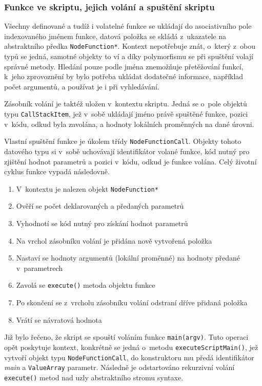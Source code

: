 \documentclass[11pt,twoside,a4paper]{book}
\begin{document}
\subsubsection{Funkce ve skriptu, jejich volání a spuštění skriptu}

Všechny definované a tudíž i volatelné funkce se ukládají do asociativního pole indexovaného jménem funkce, datová položka se skládá z~ukazatele na abstraktního předka \texttt{NodeFunction*}. Kontext nepotřebuje znát, o~který z~obou typů se jedná, samotné objekty to ví a díky polymorfismu se při spuštění volají správné metody. Hledání pouze podle jména znemožňuje přetěžování funkcí, k~jeho zprovoznění by bylo potřeba ukládat dodatečné informace, na\-pří\-klad počet argumentů, a používat je i při vyhledávání.

Zásobník volání je taktéž uložen v~kontextu skriptu. Jedná se o~pole objektů typu \texttt{Call\-Stack\-Item}, jež v~sobě ukládají jméno právě spuštěné funkce, pozici v~kódu, odkud byla zavolána, a hodnoty lokálních proměnných na dané úrovni.

Vlastní spuštění funkce je úkolem třídy \texttt{NodeFunctionCall}. Objekty tohoto datového typu si v~sobě uchovávají identifikátor volané funkce, kód nutný pro zjištění hodnot parametrů a pozici v~kódu, odkud je funkce volána. Celý životní cyklus funkce vypadá následovně.

\begin{enumerate}
\item V~kontextu je nalezen objekt \texttt{NodeFunction*}
\item Ověří se počet deklarovaných a předaných parametrů
\item Vyhodnotí se kód nutný pro získání hodnot parametrů
\item Na vrchol zásobníku volání je přidána nově vytvořená položka
\item Nastaví se hodnoty argumentů (lokální proměnné) na hodnoty předané v~parametrech
\item Zavolá se \texttt{execute()} metoda objektu funkce
\item Po skončení se z~vrcholu zásobníku volání odstraní dříve přidaná položka
\item Vrátí se návratová hodnota
\end{enumerate}

Již bylo řečeno, že skript se spouští voláním funkce \texttt{main(argv)}. Tuto operaci opět poskytuje kontext, konkrétně se jedná o~metodu \texttt{executeScriptMain()}, jež vytvoří objekt typu \texttt{NodeFunctionCall}, do konstruktoru mu předá identifikátor \textit{main} a \texttt{ValueArray} parametr. Následně je odstartováno rekurzivní volání \texttt{execute()} metod nad uzly abstraktního stromu syntaxe.
\end{document}
